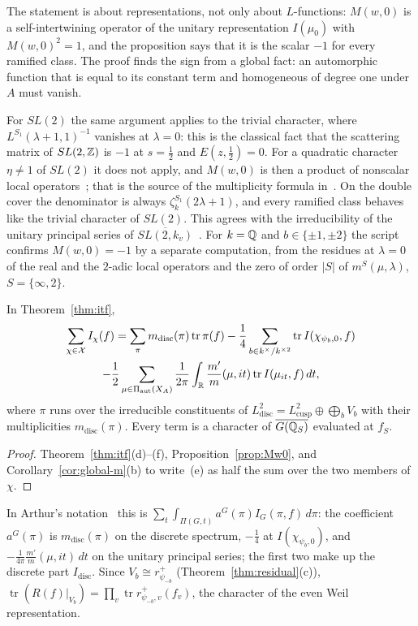 The statement is about representations, not only about $L$-functions:
$M(w,0)$ is a self-intertwining operator of the unitary representation
$I(\mu_0)$ with $M(w,0)^2=1$, and the proposition says that it is the
scalar $-1$ for every ramified class. The proof finds the sign from a
global fact: an automorphic function that is equal to its constant term
and homogeneous of degree one under $A$ must vanish.

For $SL(2)$ the same argument applies to the trivial character, where
$L^{S_1}(\lambda+1,1)^{-1}$ vanishes at $\lambda=0$: this is the classical
fact that the scattering matrix of $SL(2,\mathbb{Z})$ is $-1$ at $s=\frac12$ and
$E(z,\frac12)=0$. For a quadratic character $\eta\ne1$ of $SL(2)$ it does
not apply, and $M(w,0)$ is then a product of nonscalar local
operators~\cite{LL79}; that is the source of the multiplicity formula
in~\cite{LL79}. On the double cover the denominator is always
$\zeta_k^{S_1}(2\lambda+1)$, and every ramified class behaves like the
trivial character of $SL(2)$. This agrees with the irreducibility of the
unitary principal series of $\overline{SL(2,k_v)}$~\cite{Mo88}. For
$k=\mathbb{Q}$ and $b\in\{\pm1,\pm2\}$ the script confirms $M(w,0)=-1$ by a
separate computation, from the residues at $\lambda=0$ of the real and
the $2$-adic local operators and the zero of order $|S|$ of
$m^S(\mu,\lambda)$, $S=\{\infty,2\}$.

\begin{corollary}\label{cor:itf-final}
In Theorem~\ref{thm:itf},
\begin{multline*}
\sum_{\chi\in\mathcal X}I_\chi(f)=\sum_{\pi}m_{\mathrm{disc}}(\pi)
\operatorname{tr}\pi(f)-\frac14\sum_{b\in k^\times/k^{\times2}}
\operatorname{tr}I(\chi_{\psi_b,0},f)\\
-\frac12\sum_{\mu\in\Pi_{\mathrm{aut}}(X_A)}\frac1{2\pi}\int_{\mathbb{R}}\frac{m'}m
(\mu,it)\operatorname{tr}I(\mu_{it},f)\,dt,
\end{multline*}
where $\pi$ runs over the irreducible constituents of
$L^2_{\mathrm{disc}}=L^2_{\mathrm{cusp}}\oplus\bigoplus_bV_b$ with their
multiplicities $m_{\mathrm{disc}}(\pi)$. Every term is a character of
$\overline{G(\mathbb{Q}_S)}$ evaluated at $f_S$.
\end{corollary}

\begin{proof}
Theorem~\ref{thm:itf}(d)--(f), Proposition~\ref{prop:Mw0}, and
Corollary~\ref{cor:global-m}(b) to write~(e) as half the sum over the two
members of $\chi$.
\end{proof}

In Arthur's notation~\cite[\S4]{Ar88c} this is $\sum_t\int_{\Pi(G,t)}a^G(\pi)
I_G(\pi,f)\,d\pi$: the coefficient $a^G(\pi)$ is $m_{\mathrm{disc}}(\pi)$ on
the discrete spectrum, $-\frac14$ at $I(\chi_{\psi_b,0})$, and
$-\frac1{4\pi}\frac{m'}m(\mu,it)\,dt$ on the unitary principal series; the
first two make up the discrete part $I_{\mathrm{disc}}$. Since
$V_b\cong r^+_{\psi_{-b}}$ (Theorem~\ref{thm:residual}(c)),
$\operatorname{tr}(R(f)|_{V_b})=\prod_v\operatorname{tr}r^+_{\psi_{-b},v}
(f_v)$, the character of the even Weil representation.

